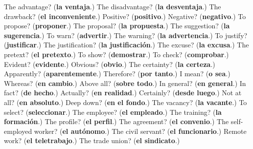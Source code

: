 \begin{tcolorbox}[breakable,colback=teal!4,colframe=teal!35!black,title={Before you move on}]
The advantage? (\textbf{la ventaja}.) The disadvantage? (\textbf{la desventaja}.) The drawback? (\textbf{el inconveniente}.) Positive? (\textbf{positivo}.) Negative? (\textbf{negativo}.) To propose? (\textbf{proponer}.) The proposal? (\textbf{la propuesta}.) The suggestion? (\textbf{la sugerencia}.) To warn? (\textbf{advertir}.) The warning? (\textbf{la advertencia}.) To justify? (\textbf{justificar}.) The justification? (\textbf{la justificación}.) The excuse? (\textbf{la excusa}.) The pretext? (\textbf{el pretexto}.) To show? (\textbf{demostrar}.) To check? (\textbf{comprobar}.) Evident? (\textbf{evidente}.) Obvious? (\textbf{obvio}.) The certainty? (\textbf{la certeza}.) Apparently? (\textbf{aparentemente}.) Therefore? (\textbf{por tanto}.) I mean? (\textbf{o sea}.) Whereas? (\textbf{en cambio}.) Above all? (\textbf{sobre todo}.) In general? (\textbf{en general}.) In fact? (\textbf{de hecho}.) Actually? (\textbf{en realidad}.) Certainly? (\textbf{desde luego}.) Not at all? (\textbf{en absoluto}.) Deep down? (\textbf{en el fondo}.) The vacancy? (\textbf{la vacante}.) To select? (\textbf{seleccionar}.) The employee? (\textbf{el empleado}.) The training? (\textbf{la formación}.) The profile? (\textbf{el perfil}.) The agreement? (\textbf{el convenio}.) The self-employed worker? (\textbf{el autónomo}.) The civil servant? (\textbf{el funcionario}.) Remote work? (\textbf{el teletrabajo}.) The trade union? (\textbf{el sindicato}.)
\end{tcolorbox}
